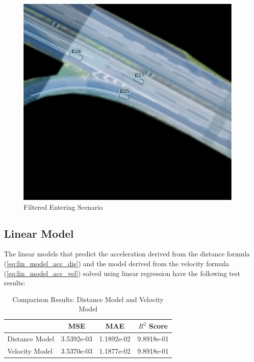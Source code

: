 \begin{figure}[htbp]
\begin{minipage}[b]{0.45\columnwidth}
        \includegraphics[width=\columnwidth]{images/figures/Filtering4.png}
        \caption{Filtered Entering Scenario}
        \label{fig:filtered2}
    \end{minipage}
    \label{fig:cfiltered2}
\end{figure}

\subsection{Linear Model}

The linear models that predict the acceleration derived from the distance formula
(\ref{eq:lin_model_acc_dis}) and the model derived from the velocity formula (\ref{eq:lin_model_acc_vel}) solved using linear regression have the following test results:


\begin{table}[h]
\centering
\caption{Comparison Results: Distance Model and Velocity Model}
\label{tab:model_comparison}
\begin{tabular}{l S[table-format=1.4e-2] S[table-format=1.4e-2] S[table-format=1.4e-2]}
\toprule
 & {MSE} & {MAE} & {$R^2$ Score} \\
\midrule
Distance Model & 3.5392e-03 & 1.1892e-02 & 9.8918e-01 \\
Velocity Model & 3.5370e-03 & 1.1877e-02 & 9.8918e-01 \\
\bottomrule
\end{tabular}
\end{table}

